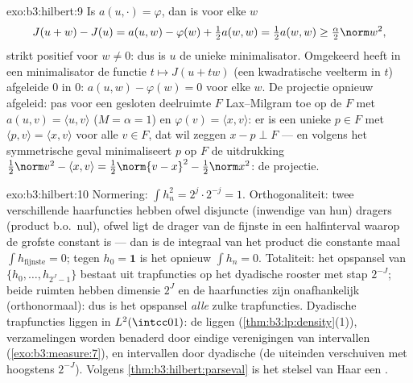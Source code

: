 \begin{solution}{exo:b3:hilbert:9}
Is $a(u, \cdot) = \varphi$, dan is voor elke $w$
\[
J(u + w) - J(u) = a(u, w) - \varphi(w) + \tfrac12a(w,w)
= \tfrac12a(w,w) \geq \tfrac\alpha2\norm w^2,
\]
strikt positief voor $w \neq 0$: dus is $u$ de unieke
minimalisator. Omgekeerd heeft in een minimalisator de functie $t
\mapsto J(u + tw)$ (een kwadratische veelterm in $t$) afgeleide
$0$ in $0$: $a(u, w) - \varphi(w) = 0$ voor elke $w$. De
projectie opnieuw afgeleid: pas voor een gesloten deelruimte $F$
Lax--Milgram toe op de  $F$ met $a(u,v) = \langle u,
v\rangle$ ($M = \alpha = 1$) en $\varphi(v) = \langle x,
v\rangle$: er is een unieke $p \in F$ met $\langle p, v\rangle =
\langle x, v\rangle$ voor alle $v \in F$, dat wil zeggen $x - p
\perp F$ --- en volgens het symmetrische geval minimaliseert $p$
op $F$ de uitdrukking $\frac12\norm v^2 - \langle x, v\rangle =
\frac12\norm{v - x}^2 - \frac12\norm x^2$: de projectie.
\end{solution}

\begin{solution}{exo:b3:hilbert:10}
Normering: $\int h_n^2 = 2^j\cdot 2^{-j} = 1$. Orthogonaliteit:
twee verschillende haarfuncties hebben ofwel disjuncte (inwendige
van hun) dragers (product b.o.\ nul), ofwel ligt de drager van de
fijnste in een halfinterval waarop de grofste constant is --- dan
is de integraal van het product die constante maal $\int
h_{\text{fijnste}} = 0$; tegen $h_0 = \mathbf 1$ is het opnieuw
$\int h_n = 0$. Totaliteit: het opspansel van $\{h_0, \dots,
h_{2^J-1}\}$ bestaat uit trapfuncties op het dyadische rooster
met stap $2^{-J}$; beide ruimten hebben dimensie $2^J$ en de
haarfuncties zijn onafhankelijk (orthonormaal): dus is het
opspansel \emph{alle} zulke trapfuncties. Dyadische trapfuncties
liggen  in $L^2(\intcc01)$: de  liggen
 (\cref{thm:b3:lp:density}(1)),  verzamelingen
worden benaderd door eindige verenigingen van intervallen
(\cref{exo:b3:measure:7}), en intervallen door dyadische (de
uiteinden verschuiven met hoogstens $2^{-J}$). Volgens
\cref{thm:b3:hilbert:parseval} is het stelsel van Haar een
.
\end{solution}

